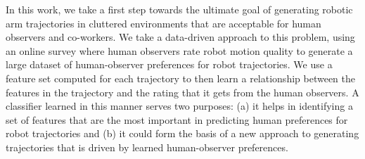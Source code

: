 \documentclass[letterpaper, 10 pt, conference]{ieeeconf}  %
\begin{document}
In this work, we take a first step towards the ultimate goal of generating robotic arm trajectories in cluttered environments that are acceptable for human observers and co-workers. We take a data-driven approach to this problem, using an online survey where human observers rate robot motion quality to generate a large dataset of human-observer preferences for robot trajectories. We use a feature set computed for each trajectory to then learn a relationship between the features in the trajectory and the rating that it gets from the human observers. A classifier learned in this manner serves two purposes: (a) it helps in identifying a set of features that are the most important in predicting human preferences for robot trajectories and (b) it could form the basis of a new approach to generating trajectories that is driven by learned human-observer preferences.
\end{document}
